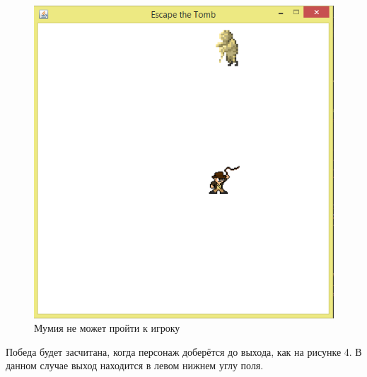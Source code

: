 \begin{figure}[H]
	\begin{center}
		\includegraphics[scale=0.7]{image/field2.png}
		\caption{Мумия не может пройти к игроку} 
		\label{pic:pic_name} %
	\end{center}
\end{figure}

Победа будет засчитана, когда персонаж доберётся до выхода, как на рисунке 4. В данном случае выход находится в левом нижнем углу поля. 

